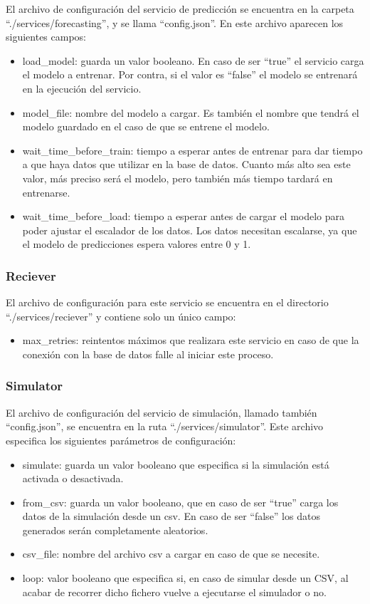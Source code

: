 El archivo de configuración del servicio de predicción se encuentra en la carpeta ``./services/forecasting'', y 
se llama ``config.json''. En este archivo aparecen los siguientes campos:
\begin{itemize}
    \item load\_model: guarda un valor booleano. En caso de ser ``true'' el servicio carga el modelo a entrenar.
        Por contra, si el valor es ``false'' el modelo se entrenará en la ejecución del servicio.
    \item model\_file: nombre del modelo a cargar. Es también el nombre que tendrá el modelo guardado en el caso 
        de que se entrene el modelo.
    \item wait\_time\_before\_train: tiempo a esperar antes de entrenar para dar tiempo a que haya datos que 
        utilizar en la base de datos. Cuanto más alto sea este valor, más preciso será el modelo, pero también
        más tiempo tardará en entrenarse.
    \item wait\_time\_before\_load: tiempo a esperar antes de cargar el modelo para poder ajustar el escalador de los
        datos. Los datos necesitan escalarse, ya que el modelo de predicciones espera valores entre 0 y 1.
\end{itemize}

\subsubsection{Reciever}

El archivo de configuración para este servicio se encuentra en el directorio ``./services/reciever'' y 
contiene solo un único campo:
\begin{itemize}
    \item max\_retries: reintentos máximos que realizara este servicio en caso de que la conexión con 
        la base de datos falle al iniciar este proceso.
\end{itemize}

\subsubsection{Simulator}

El archivo de configuración del servicio de simulación, llamado también ``config.json'', se encuentra en la 
ruta ``./services/simulator''. Este archivo especifica los siguientes parámetros de configuración:
\begin{itemize}
  \item simulate: guarda un valor booleano que especifica si la simulación está activada o desactivada.
  \item from\_csv: guarda un valor booleano, que en caso de ser ``true'' carga los datos de la simulación desde
    un csv. En caso de ser ``false'' los datos generados serán completamente aleatorios.
  \item csv\_file: nombre del archivo csv a cargar en caso de que se necesite.
  \item loop: valor booleano que especifica si, en caso de simular desde un CSV, al acabar de recorrer dicho fichero 
    vuelve a ejecutarse el simulador o no.
\end{itemize}

